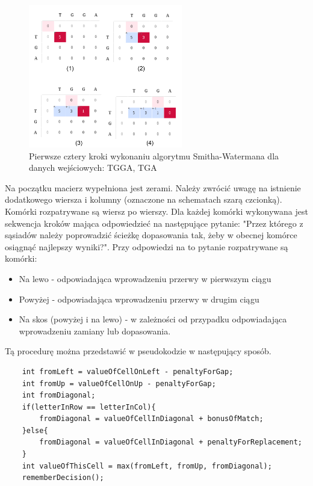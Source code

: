 \documentclass[a4paper,12pt]{article}
\newenvironment{lista}{
\begin{itemize}
  \setlength{\itemsep}{1pt}
  \setlength{\parskip}{0pt}
  \setlength{\parsep}{0pt}
}{\end{itemize}}
\begin{document}
\begin{figure}[H]
  \vspace{5pt}
  \centering
  \begin{center}
  \includegraphics[width=0.6\textwidth]{images/SchematDzialaniaAlgorytmu.png}
  \end{center}
  \caption{Pierwsze cztery kroki wykonaniu algorytmu Smitha-Watermana dla danych wejściowych: TGGA, TGA}
 \end{figure}

Na początku macierz wypełniona jest zerami. Należy zwrócić uwagę na istnienie dodatkowego wiersza i kolumny (oznaczone na schematach szarą czcionką). Komórki rozpatrywane są wiersz po wierszy. Dla każdej komórki wykonywana jest sekwencja kroków mająca odpowiedzieć na następujące pytanie: "Przez którego z sąsiadów należy poprowadzić ścieżkę dopasowania tak, żeby w obecnej komórce osiągnąć najlepszy wyniki?". Przy odpowiedzi na to pytanie rozpatrywane są komórki:
\begin{lista}
\item Na lewo - odpowiadająca wprowadzeniu przerwy w pierwszym ciągu
\item Powyżej - odpowiadająca wprowadzeniu przerwy w drugim ciągu
\item Na skos (powyżej i na lewo) - w zależności od przypadku odpowiadająca wprowadzeniu zamiany lub dopasowania.
\end{lista}

Tą procedurę można przedstawić w pseudokodzie w następujący sposób. 

\begin{lstlisting}
	int fromLeft = valueOfCellOnLeft - penaltyForGap;
	int fromUp = valueOfCellOnUp - penaltyForGap;
	int fromDiagonal;
	if(letterInRow == letterInCol){
		fromDiagonal = valueOfCellInDiagonal + bonusOfMatch;
	}else{
		fromDiagonal = valueOfCellInDiagonal + penaltyForReplacement;
	}
	int	valueOfThisCell = max(fromLeft, fromUp, fromDiagonal);
	rememberDecision();
\end{lstlisting}
\end{document}
